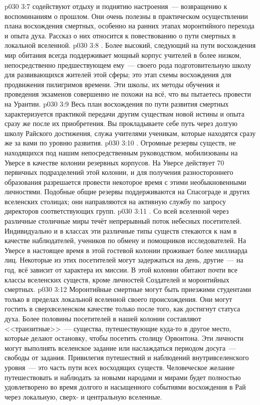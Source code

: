 \vs p030 3:7  содействуют отдыху и поднятию настроения~--- возвращению к воспоминаниям о прошлом. Они очень полезны в практическом осуществлении плана восхождения смертных, особенно на ранних этапах моронтийного перехода и опыта духа. Рассказ о них относится к повествованию о пути смертных в локальной вселенной.
\vs p030 3:8 . Более высокий, следующий на пути восхождения мир обитания всегда поддерживает мощный корпус учителей в более низком, непосредственно предшествующем ему~--- своего рода подготовительную школу для развивающихся жителей этой сферы; это этап схемы восхождения для продвижения пилигримов времени. Эти школы, их методы обучения и проведения экзаменов совершенно не похожи на всё, что вы пытаетесь провести на Урантии.
\vs p030 3:9 Весь план восхождения по пути развития смертных характеризуется практикой передачи другим существам новой истины и опыта сразу же после их приобретения. Вы прокладываете себе путь через долгую школу Райского достижения, служа учителями ученикам, которые находятся сразу же за вами по уровню развития.
\vs p030 3:10 . Огромные резервы существ, не находящихся под нашим непосредственным руководством, мобилизованы на Уверсе в качестве колонии резервных корпусов. На Уверсе действует 70 первичных подразделений этой колонии, и для получения разностороннего образования разрешается провести некоторое время с этими необыкновенными личностями. Подобные общие резервы поддерживаются на Спасограде и других вселенских столицах; они направляются на активную службу по запросу директоров соответствующих групп.
\vs p030 3:11 . Со всей вселенной через различные столичные миры течёт непрерывный поток небесных посетителей. Индивидуально и в классах эти различные типы существ стекаются к нам в качестве наблюдателей, учеников по обмену и помощников исследователей. На Уверсе в настоящее время в этой гостевой колонии проживает более миллиарда лиц. Некоторые из этих посетителей могут задержаться на день, другие~--- на год, всё зависит от характера их миссии. В этой колонии обитают почти все классы вселенских существ, кроме личностей Создателей и моронтийных смертных.
\vs p030 3:12 Моронтийные смертные могут быть приезжими студентами только в пределах локальной вселенной своего происхождения. Они могут гостить в сверхвселенском качестве только после того, как достигнут статуса духа. Более половины посетителей в нашей колонии составляют <<транзитные>>~--- существа, путешествующие куда\hyp{}то в другое место, которые делают остановку, чтобы посетить столицу Орвонтона. Эти личности могут выполнять вселенское задание или наслаждаться периодом досуга~--- свободы от задания. Привилегия путешествий и наблюдений внутривселенского уровня~--- это часть пути всех восходящих существ. Человеческое желание путешествовать и наблюдать за новыми народами и мирами будет полностью удовлетворено во время долгого и насыщенного событиями восхождения в Рай через локальную, сверх- и центральную вселенные.
